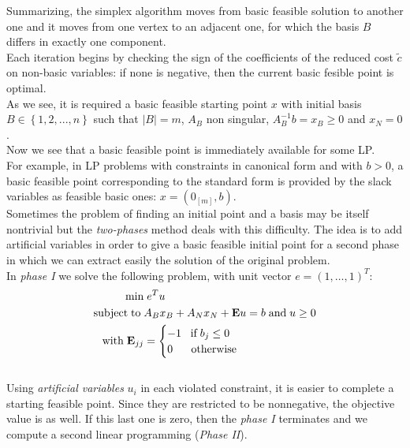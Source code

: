 \documentclass[a4paper,10 pt,titlepage,twoside]{book}
\theoremstyle{plain}
\theoremstyle{definition}
\theoremstyle{remark}
\begin{document}
Summarizing, the simplex algorithm moves from basic feasible solution to another one and it moves from one vertex to an adjacent one, for which the basis $B$ differs in exactly one component.\\ Each iteration begins by checking the sign of the coefficients of the reduced cost $\widetilde{c}$ on non-basic variables: if none is negative, then the current basic fesible point is optimal. \\
As we see, it is required a basic feasible starting point $x$ with initial basis $B \in \left\{ 1,2,..., n \right\}$ such that $|B|=m$, $A_{B}$ non singular, $A_{B}^{-1}b=x_{B} \geq 0$ and $x_{N}=0$.\\[1cm]
Now we see that a basic feasible point is immediately available for some LP.\\ For example, in LP problems with constraints in canonical form and with $b > 0$, a basic feasible point corresponding to the standard form is provided by the slack variables as feasible basic ones: $x =\left(0_{[m]},b\right)$.\\Sometimes the problem of finding an initial point and a basis may be itself nontrivial but the \textit{two-phases} method deals with this difficulty. The idea is to add artificial variables in order to give a basic feasible initial point for a second phase in which we can extract easily the solution of the original problem.\\
In \textit{phase I} we solve the following problem, with unit vector $e= (1,\dots,1)^{T}$:
\begin{equation}\label{IIPH}
\begin{split}
\min &\;e^{T}u\\
\text{subject\;to\;}&A_{B}x_{B}+A_{N}x_{N} + \textbf{E}u = b\;\text{and\;} u\geq 0\\
\text{with\;} \textbf{E}_{jj}& =\begin{cases} -1\;\text{\;\;if\;} b_{j} \leq 0\\
0\;\; \text{\;\;\;\;otherwise}
\end{cases}   
\end{split}
\end{equation} \\
Using \textit{artificial variables} $u_{i}$ in each violated constraint, it is easier to complete a starting feasible point. Since they are restricted to be nonnegative, the objective value is as well. If this last one is zero, then the \textit{phase I} terminates and we compute a second linear programming (\textit{Phase II}).\\
\end{document}
